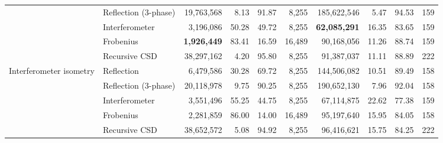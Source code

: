 \begin{table}[htbp]
\begin{tabular}{llrrrrrrrr}
     & Reflection (3-phase) & 19{,}763{,}568 & 8.13 & 91.87 & 8{,}255 & 185{,}622{,}546 & 5.47 & 94.53 & 159 \\
     & Interferometer & 3{,}196{,}086 & 50.28 & 49.72 & 8{,}255 & \textbf{62{,}085{,}291} & 16.35 & 83.65 & 159 \\
     & Frobenius & \textbf{1{,}926{,}449} & 83.41 & 16.59 & 16{,}489 & 90{,}168{,}056 & 11.26 & 88.74 & 159 \\
     & Recursive CSD & 38{,}297{,}162 & 4.20 & 95.80 & 8{,}255 & 91{,}387{,}037 & 11.11 & 88.89 & 222 \\
    \midrule
    Interferometer isometry & Reflection & 6{,}479{,}586 & 30.28 & 69.72 & 8{,}255 & 144{,}506{,}082 & 10.51 & 89.49 & 158 \\
     & Reflection (3-phase) & 20{,}118{,}978 & 9.75 & 90.25 & 8{,}255 & 190{,}652{,}130 & 7.96 & 92.04 & 158 \\
     & Interferometer & 3{,}551{,}496 & 55.25 & 44.75 & 8{,}255 & 67{,}114{,}875 & 22.62 & 77.38 & 159 \\
     & Frobenius & 2{,}281{,}859 & 86.00 & 14.00 & 16{,}489 & 95{,}197{,}640 & 15.95 & 84.05 & 158 \\
     & Recursive CSD & 38{,}652{,}572 & 5.08 & 94.92 & 8{,}255 & 96{,}416{,}621 & 15.75 & 84.25 & 222 \\
    \bottomrule
  \end{tabular}
\end{table}
